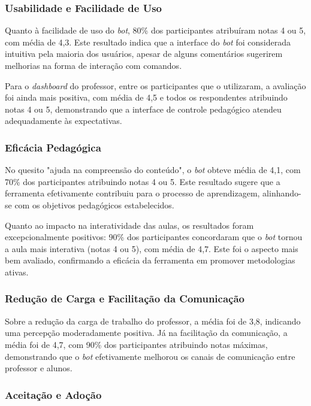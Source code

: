 \subsubsection{Usabilidade e Facilidade de Uso}

Quanto à facilidade de uso do \textit{bot}, 80\% dos participantes atribuíram
notas 4 ou 5, com média de 4,3. Este resultado indica que a interface do
\textit{bot} foi considerada intuitiva pela maioria dos usuários, apesar de
alguns comentários sugerirem melhorias na forma de interação com comandos.

Para o \textit{dashboard} do professor, entre os participantes que o utilizaram,
a avaliação foi ainda mais positiva, com média de 4,5 e todos os respondentes
atribuindo notas 4 ou 5, demonstrando que a interface de controle pedagógico
atendeu adequadamente às expectativas.

\subsubsection{Eficácia Pedagógica}

No quesito "ajuda na compreensão do conteúdo", o \textit{bot} obteve média de
4,1, com 70\% dos participantes atribuindo notas 4 ou 5. Este resultado sugere
que a ferramenta efetivamente contribuiu para o processo de aprendizagem,
alinhando-se com os objetivos pedagógicos estabelecidos.

Quanto ao impacto na interatividade das aulas, os resultados foram
excepcionalmente positivos: 90\% dos participantes concordaram que o \textit{bot}
tornou a aula mais interativa (notas 4 ou 5), com média de 4,7. Este foi o
aspecto mais bem avaliado, confirmando a eficácia da ferramenta em promover
metodologias ativas.

\subsubsection{Redução de Carga e Facilitação da Comunicação}

Sobre a redução da carga de trabalho do professor, a média foi de 3,8, indicando
uma percepção moderadamente positiva. Já na facilitação da comunicação, a média
foi de 4,7, com 90\% dos participantes atribuindo notas máximas, demonstrando
que o \textit{bot} efetivamente melhorou os canais de comunicação entre
professor e alunos.

\subsubsection{Aceitação e Adoção}


